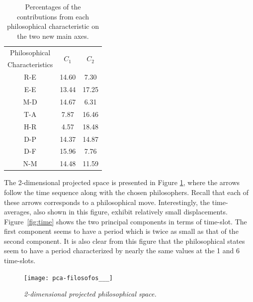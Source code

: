 \documentclass[%
 aip,
 jmp,%
 amsmath,amssymb,
 reprint,%
]{revtex4-1}
\begin{document}
\begin{table}%
\caption{\label{tab:Deviates}Percentages of
the contributions from each philosophical characteristic on the two new main axes.  }
\begin{tabular}{|c||c|c|}
\hline
Philosophical & \multirow{2}{*}{$C_1$} & \multirow{2}{*}{$C_2$} \\
Characteristics & & \\
\hline
R-E & 14.60 & 7.30  \\
E-E & 13.44    & 17.25 \\
M-D & 14.67    & 6.31 \\
T-A & 7.87    & 16.46 \\
H-R & 4.57    & 18.48 \\
D-P & 14.37    & 14.87 \\
D-F & 15.96    & 7.76 \\
N-M & 14.48    & 11.59 \\
\hline

\end{tabular}
\end{table}

The 2-dimensional projected space is presented in Figure
\ref{fig:pca}, where the arrows follow the time sequence along with
the chosen philosophers.  Recall that each of these arrows corresponds
to a philosophical move.  Interestingly, the time-averages, also shown
in this figure, exhibit relatively small displacements.
Figure~\ref{fig:time} shows the two principal components in terms of
time-slot.  The first component seems to have a period which is twice
as small as that of the second component.  It is also clear from this
figure that the philosophical states seem to have a period
characterized by nearly the same values at the 1 and 6 time-slots.

\begin{figure}
        \begin{center}
                \texttt{[image: pca-filosofos\_\_\_]}
        \end{center}
        \caption{\it 2-dimensional projected philosophical space.}
        \label{fig:pca}
\end{figure}
\end{document}
